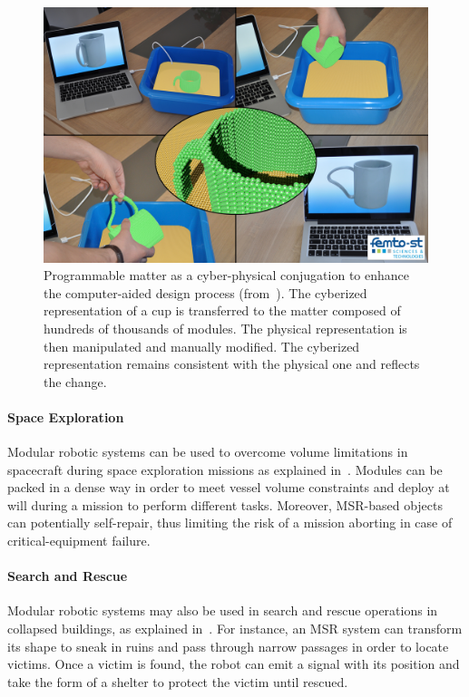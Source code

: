 \begin{figure}[!h]
	\centering
	\includegraphics[width=0.7\linewidth]{images/context/cup.jpg}
	\caption{Programmable matter as a cyber-physical conjugation to enhance the computer-aided design process (from~\cite{bourgeois-smc2016}). The cyberized representation of a cup is transferred to the matter composed of hundreds of thousands of modules. The physical representation is then manipulated and manually modified. The cyberized representation remains consistent with the physical one and reflects the change.}
	\label{fig:context:pm-cup}
\end{figure}

\paragraph{Space Exploration}

Modular robotic systems can be used to overcome volume limitations in spacecraft during space exploration missions as explained in~\cite{yim2009modular}. Modules can be packed in a dense way in order to meet vessel volume constraints and deploy at will during a mission to perform different tasks. Moreover, MSR-based objects can potentially self-repair, thus limiting the risk of a mission aborting in case of critical-equipment failure.

\paragraph{Search and Rescue}

Modular robotic systems may also be used in search and rescue operations in collapsed buildings, as explained in~\cite{yim2009modular}. For instance, an MSR system can transform its shape to sneak in ruins and pass through narrow passages in order to locate victims. Once a victim is found, the robot can emit a signal with its position and take the form of a shelter to protect the victim until rescued.

